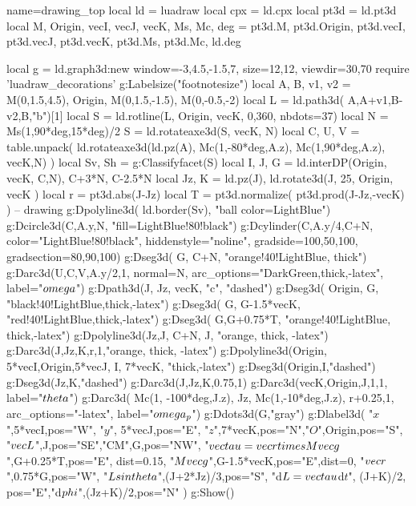 \documentclass[border=5pt]{standalone}%
\begin{document}
\begin{luadraw}{name=drawing_top}
local ld = luadraw
local cpx = ld.cpx
local pt3d = ld.pt3d
local M, Origin, vecI, vecJ, vecK, Ms, Mc, deg = pt3d.M, pt3d.Origin, pt3d.vecI, pt3d.vecJ, pt3d.vecK, pt3d.Ms, pt3d.Mc, ld.deg

local g = ld.graph3d:new{ window={-3,4.5,-1.5,7}, size={12,12}, viewdir={30,70} }
require 'luadraw_decorations'
g:Labelsize("footnotesize")
local A, B, v1, v2 = M(0,1.5,4.5), Origin, M(0,1.5,-1.5), M(0,-0.5,-2)
local L = ld.path3d( {A,A+v1,B-v2,B,"b"})[1]
local S = ld.rotline(L, {Origin, vecK}, 0,360, {nbdots=37})
local N = Ms(1,90*deg,15*deg)/2
S = ld.rotateaxe3d(S, vecK, N)
local C, U, V = table.unpack( ld.rotateaxe3d({ld.pz(A), Mc(1,-80*deg,A.z), Mc(1,90*deg,A.z)}, vecK,N) )
local Sv, Sh = g:Classifyfacet(S)
local I, J, G = ld.interDP({Origin, vecK}, {C,N}), C+3*N, C-2.5*N
local Jz, K = ld.pz(J), ld.rotate3d(J, 25, {Origin, vecK} )
local r = pt3d.abs(J-Jz)
local T = pt3d.normalize( pt3d.prod(J-Jz,-vecK) )
-- drawing
g:Dpolyline3d( ld.border(Sv), "ball color=LightBlue")
g:Dcircle3d(C,A.y,N, "fill=LightBlue!80!black")
g:Dcylinder(C,A.y/4,C+N, {color="LightBlue!80!black", hiddenstyle="noline", gradside={100,50,100}, gradsection={80,90,100}})
g:Dseg3d( {G, C+N}, "orange!40!LightBlue, thick")
g:Darc3d(U,C,V,A.y/2,1, {normal=N, arc_options="DarkGreen,thick,-latex", label="$\\omega$"})
g:Dpath3d({J, Jz, vecK, "c"}, "dashed")
g:Dseg3d( {Origin, G}, "black!40!LightBlue,thick,-latex")
g:Dseg3d( {G, G-1.5*vecK}, "red!40!LightBlue,thick,-latex")
g:Dseg3d( {G,G+0.75*T}, "orange!40!LightBlue, thick,-latex")
g:Dpolyline3d({{Jz,J}, {C+N, J}}, "orange, thick, -latex")
g:Darc3d(J,Jz,K,r,1,"orange, thick, -latex")
g:Dpolyline3d({{Origin, 5*vecI},{Origin,5*vecJ}, {I, 7*vecK}}, "thick,-latex")
g:Dseg3d({Origin,I},"dashed")
g:Dseg3d({Jz,K},"dashed")
g:Darc3d(J,Jz,K,0.75,1)
g:Darc3d(vecK,Origin,J,1,1, {label="$\\theta$"})
g:Darc3d( Mc(1, -100*deg,J.z), Jz, Mc(1,-10*deg,J.z), r+0.25,1, {arc_options="-latex", label="$\\omega_p$"})
g:Ddots3d(G,"gray")
g:Dlabel3d( "$x$",5*vecI,{pos="W"}, "$y$", 5*vecJ,{pos="E"}, "$z$",7*vecK,{pos="N"},"$O$",Origin,{pos="S"},
    "$\\vec{L}$",J,{pos="SE"},"CM",G,{pos="NW"},
    "$\\vec{\\tau}=\\vec r\\times M\\vec g$",G+0.25*T,{pos="E", dist=0.15},
    "$M\\vec g$",G-1.5*vecK,{pos="E",dist=0}, "$\\vec r$",0.75*G,{pos="W"},
    "$L\\sin\\theta$",(J+2*Jz)/3,{pos="S"},
    "d$L=\\vec{\\tau}$d$t$", (J+K)/2, {pos="E"},"d$\\phi$",(Jz+K)/2,{pos="N"} )
g:Show()
\end{luadraw}
\end{document}
